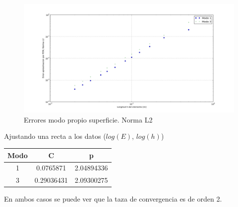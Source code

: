 \begin{figure}
  \centering
  \includegraphics[width=17cm]{figuras/vectores_propiosFEM.png}
  \caption{ Errores modo propio superficie. Norma L2}  
  \label{fig:vectores_propios}
\end{figure}

Ajustando una recta a los datos ($log(E)$, $log(h)$)
\begin{center}
\begin{tabular}{|c|c|c|}
\hline 
Modo & C & p \\ 
\hline 
1 & 0.0765871 & 2.04894336 \\  
\hline 
3 & 0.29036431 & 2.09300275 \\  
\hline 
\end{tabular} 
\end{center}

En ambos casos se puede ver que la taza de convergencia es de orden 2.

